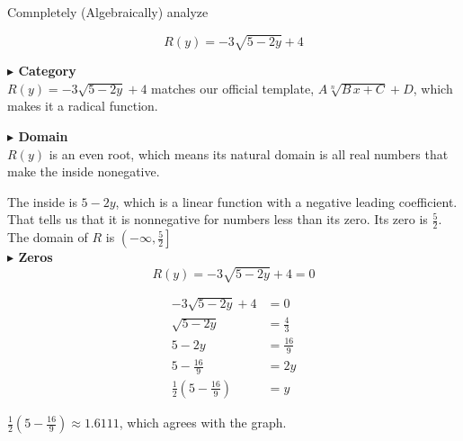 \documentclass{ximera}
\begin{document}
\begin{example}

Comnpletely (Algebraically) analyze

\[
R(y) = -3 \sqrt{5-2y} + 4
\]









\textbf{\textcolor{blue!55!black}{$\blacktriangleright$ Category}} \\



$R(y) = -3 \sqrt{5-2y} + 4$ matches our official template, $A \sqrt[n]{B \, x + C} + D $, which makes it a radical function.  





\textbf{\textcolor{blue!55!black}{$\blacktriangleright$ Domain}} \\


$R(y)$ is an even root, which means its natural domain is all real numbers that make the inside nonegative.

The inside is $5-2y$, which is a linear function with a negative leading coefficient.  That tells us that it is nonnegative for numbers less than its zero.  Its zero is $\frac{5}{2}$.\\

The domain of $R$ is $\left( -\infty, \frac{5}{2} \right]$\\






\textbf{\textcolor{blue!55!black}{$\blacktriangleright$ Zeros}} \\

\[
R(y) = -3 \sqrt{5-2y} + 4 = 0
\]

\begin{align*}
-3 \sqrt{5-2y} + 4 &= 0 \\
\sqrt{5-2y} &= \frac{4}{3} \\
5 - 2y &= \frac{16}{9} \\
5 - \frac{16}{9} &= 2y  \\
\frac{1}{2} \left( 5 - \frac{16}{9} \right) &= y  
\end{align*}


$\frac{1}{2} \left( 5 - \frac{16}{9} \right) \approx 1.6111$, which agrees with the graph. \\















\end{example}
\end{document}
